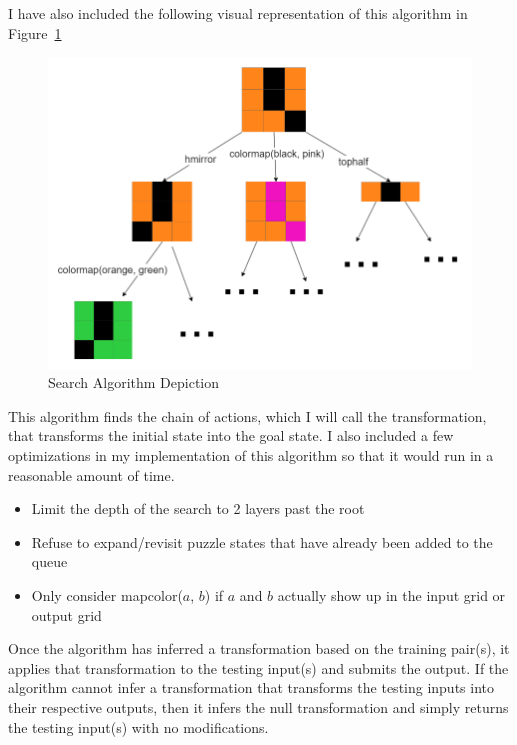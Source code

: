 \documentclass[letterpaper]{article} %
\begin{document}
\bigskip

I have also included the following visual representation of this algorithm in Figure~\ref{fig:algorithm}
\begin{figure}[htbp]
    \centering
    \includegraphics[width=\hsize]{BFS_tree.drawio.png}
    \caption{Search Algorithm Depiction}
    \label{fig:algorithm}
\end{figure}

\bigskip

This algorithm finds the chain of actions, which I will call the transformation, that transforms the initial state into the goal state. I also included a few optimizations in my implementation of this algorithm so that it would run in a reasonable amount of time.
\begin{itemize}
    \item Limit the depth of the search to 2 layers past the root
    \item Refuse to expand/revisit puzzle states that have already been added to the queue
    \item Only consider mapcolor($a$, $b$) if $a$ and $b$ actually show up in the input grid or output grid
\end{itemize}

\bigskip

Once the algorithm has inferred a transformation based on the training pair(s), it applies that transformation to the testing input(s) and submits the output. If the algorithm cannot infer a transformation that transforms the testing inputs into their respective outputs, then it infers the null transformation and simply returns the testing input(s) with no modifications.
\end{document}

